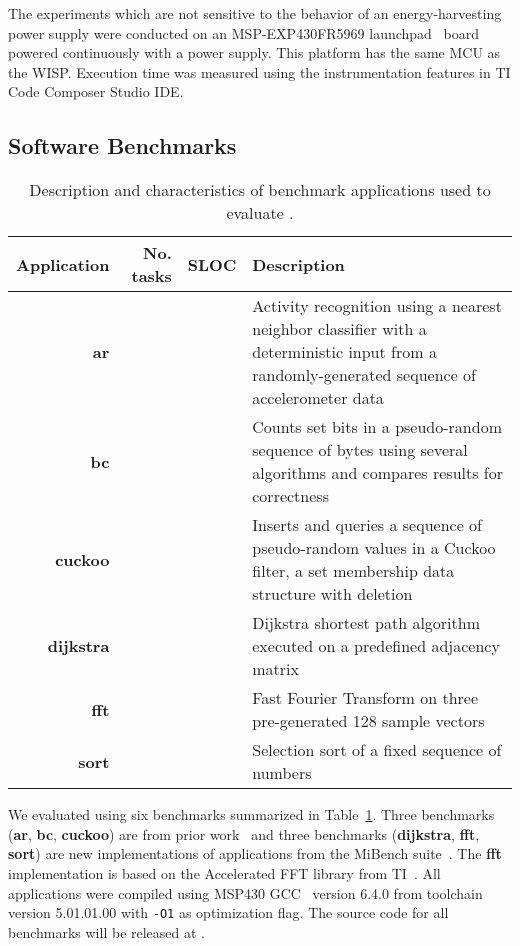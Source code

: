 The experiments which are not sensitive to the behavior of an
energy-harvesting power supply were conducted on an MSP-EXP430FR5969
launchpad~\cite{MSP-EXP430FR5969_launchpad} board powered continuously with a
power supply.
%
This platform has the same MCU as the WISP.
%
Execution time was measured using the instrumentation features in TI Code
Composer Studio IDE.
%

\subsection{Software Benchmarks}
\label{sec:software_benchmarks}

\begin{table}
	\centering
	\footnotesize
	\begin{tabular}{| r|r|r | p{} |}
		\hline
		Application & No. tasks & SLOC & Description \\
		\hline\hline
        \textbf{ar} & & & Activity recognition using a nearest neighbor
classifier with a deterministic input from a randomly-generated sequence of
accelerometer data\\
		\hline
        \textbf{bc} & & & Counts set bits in a pseudo-random sequence of bytes
using several algorithms and compares results for correctness\\
		\hline
        \textbf{cuckoo} & & & Inserts and queries a sequence of pseudo-random
values in a Cuckoo filter, a set membership data structure with deletion\\
		\hline
        \textbf{dijkstra} &  & & Dijkstra shortest path algorithm executed on a
predefined adjacency matrix\\
		\hline
        \textbf{fft} & & & Fast Fourier Transform on three pre-generated 128
sample vectors\\
		\hline
		\textbf{sort} & & & Selection sort of a fixed sequence of numbers\\
		\hline
	\end{tabular}
\caption{Description and characteristics of benchmark applications used to
evaluate \sys.}
\label{table:benchmark_table}
\end{table}

We evaluated \sys using six benchmarks summarized in
Table~\ref{table:benchmark_table}. %
Three benchmarks (\textbf{ar}, \textbf{bc}, \textbf{cuckoo}) are from prior
work~\cite{chain,alpaca} and three benchmarks (\textbf{dijkstra},
\textbf{fft}, \textbf{sort}) are new implementations of applications
from the MiBench suite~\cite{mibench,hicks_mibench2_2016}. The
\textbf{fft} implementation is based on the Accelerated FFT library from
TI~\cite{ti_dsp}. All applications were compiled using MSP430 GCC~\cite{ti-gcc} version 6.4.0
from toolchain version 5.01.01.00 with \texttt{-O1} as optimization flag.
%
The source code for all benchmarks will be released at \cite{coala_website}.


